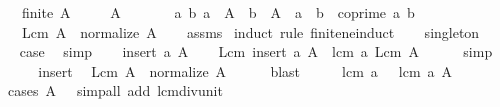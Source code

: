\begin{isabellebody}
\ \ \ {\isachardoublequoteopen}finite\ A{\isachardoublequoteclose}\isanewline
\ \ \ \ \ {\isachardoublequoteopen}A\ {\isasymnoteq}\ {\isacharbraceleft}{\kern0pt}{\isacharbraceright}{\kern0pt}{\isachardoublequoteclose}\isanewline
\ \ \ \ \ {\isachardoublequoteopen}{\isasymAnd}a\ b{\isachardot}{\kern0pt}\ a\ {\isasymin}\ A\ {\isasymLongrightarrow}\ b\ {\isasymin}\ A\ {\isasymLongrightarrow}\ a\ {\isasymnoteq}\ b\ {\isasymLongrightarrow}\ coprime\ a\ b{\isachardoublequoteclose}\isanewline
\ \ \ {\isachardoublequoteopen}Lcm\ A\ {\isacharequal}{\kern0pt}\ normalize\ {\isacharparenleft}{\kern0pt}{\isasymProd}A{\isacharparenright}{\kern0pt}{\isachardoublequoteclose}\isanewline
%
\isadelimproof
\ \ %
\endisadelimproof
%
\isatagproof
{}\isamarkupfalse%
\ assms\isanewline
{}\isamarkupfalse%
\ {\isacharparenleft}{\kern0pt}induct\ rule{\isacharcolon}{\kern0pt}\ finite{\isacharunderscore}{\kern0pt}ne{\isacharunderscore}{\kern0pt}induct{\isacharparenright}{\kern0pt}\isanewline
\ \ \isamarkupfalse%
\ singleton\isanewline
\ \ \isamarkupfalse%
\ \isamarkupfalse%
\ {\isacharquery}{\kern0pt}case\ \isamarkupfalse%
\ simp\isanewline
{}\isamarkupfalse%
\isanewline
\ \ \isamarkupfalse%
\ {\isacharparenleft}{\kern0pt}insert\ a\ A{\isacharparenright}{\kern0pt}\isanewline
\ \ \isamarkupfalse%
\ {\isachardoublequoteopen}Lcm\ {\isacharparenleft}{\kern0pt}insert\ a\ A{\isacharparenright}{\kern0pt}\ {\isacharequal}{\kern0pt}\ lcm\ a\ {\isacharparenleft}{\kern0pt}Lcm\ A{\isacharparenright}{\kern0pt}{\isachardoublequoteclose}\isanewline
\ \ \ \ \isamarkupfalse%
\ simp\isanewline
\ \ \isamarkupfalse%
\ \isamarkupfalse%
\ insert\ \isamarkupfalse%
\ {\isachardoublequoteopen}Lcm\ A\ {\isacharequal}{\kern0pt}\ normalize\ {\isacharparenleft}{\kern0pt}{\isasymProd}A{\isacharparenright}{\kern0pt}{\isachardoublequoteclose}\isanewline
\ \ \ \ \isamarkupfalse%
\ blast\isanewline
\ \ \isamarkupfalse%
\ \isamarkupfalse%
\ {\isachardoublequoteopen}lcm\ a\ {\isasymdots}\ {\isacharequal}{\kern0pt}\ lcm\ a\ {\isacharparenleft}{\kern0pt}{\isasymProd}A{\isacharparenright}{\kern0pt}{\isachardoublequoteclose}\isanewline
\ \ \ \ \isamarkupfalse%
\ {\isacharparenleft}{\kern0pt}cases\ {\isachardoublequoteopen}{\isasymProd}A\ {\isacharequal}{\kern0pt}\ {}{\isachardoublequoteclose}{\isacharparenright}{\kern0pt}\ {\isacharparenleft}{\kern0pt}simp{\isacharunderscore}{\kern0pt}all\ add{\isacharcolon}{\kern0pt}\ lcm{\isacharunderscore}{\kern0pt}div{\isacharunderscore}{\kern0pt}unit{}{\isacharparenright}{\kern0pt}\isanewline

\end{isabellebody}
